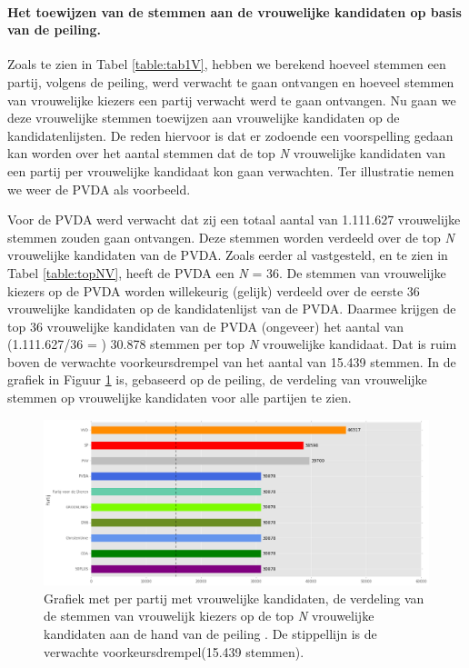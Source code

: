 \paragraph{Het toewijzen van de stemmen aan de vrouwelijke kandidaten op basis van de peiling.}
Zoals te zien in Tabel \ref{table:tab1V}, hebben we berekend hoeveel stemmen een partij, volgens de peiling, werd verwacht te gaan ontvangen en hoeveel stemmen van vrouwelijke kiezers een partij verwacht werd te gaan ontvangen. Nu gaan we deze vrouwelijke stemmen toewijzen aan vrouwelijke kandidaten op de kandidatenlijsten. De reden hiervoor is dat er zodoende een voorspelling gedaan kan worden over het aantal stemmen dat de top \textit{N} vrouwelijke kandidaten van een partij per vrouwelijke kandidaat kon gaan verwachten. Ter illustratie nemen we weer de PVDA als voorbeeld.

Voor de PVDA werd verwacht dat zij een totaal aantal van 1.111.627 vrouwelijke stemmen zouden gaan ontvangen. Deze stemmen worden verdeeld over de top \textit{N} vrouwelijke kandidaten van de PVDA. Zoals eerder al vastgesteld, en te zien in Tabel \ref{table:topNV}, heeft de PVDA een \textit{N} = 36. De stemmen van vrouwelijke kiezers op de PVDA worden willekeurig (gelijk) verdeeld over de eerste 36 vrouwelijke kandidaten op de kandidatenlijst van de PVDA. Daarmee krijgen de top 36 vrouwelijke kandidaten van de PVDA (ongeveer) het aantal van (1.111.627/36 = ) 30.878 stemmen per top \textit{N} vrouwelijke kandidaat. Dat is ruim boven de verwachte voorkeursdrempel van het aantal van 15.439 stemmen. In de grafiek in Figuur \ref{fig:stemmenV1} is, gebaseerd op de peiling, de verdeling van vrouwelijke stemmen op vrouwelijke kandidaten voor alle partijen te zien.

  
\begin{figure}[H]

	\includegraphics[width=\linewidth]	{stemmen_op_vrouwen_topN_peiling.png}

			\caption{Grafiek met per partij met vrouwelijke kandidaten, de verdeling van de stemmen van vrouwelijk kiezers op de top \textit{N} vrouwelijke kandidaten aan de hand van de peiling \citep{IPSOS}. De stippellijn is de verwachte voorkeursdrempel(15.439 stemmen).}

\label{fig:stemmenV1}
\end{figure}

